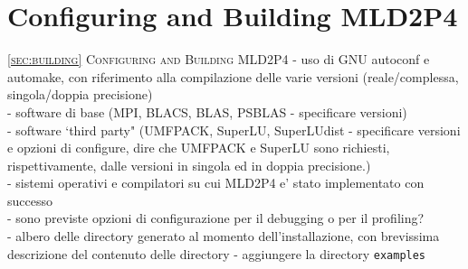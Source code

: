\section{Configuring and Building MLD2P4\label{sec:building}}
         {\textsc{\ref{sec:building} Configuring and Building MLD2P4}}
    - uso di GNU autoconf e automake, con riferimento alla compilazione delle varie versioni
      (reale/complessa, singola/doppia precisione) \\
    - software di base (MPI, BLACS, BLAS, PSBLAS - specificare versioni)\\
    - software `third party" (UMFPACK, SuperLU, SuperLUdist - specificare versioni e opzioni di 
    configure, dire che UMFPACK e SuperLU sono richiesti, rispettivamente, dalle versioni in 
    singola ed in doppia precisione.)\\
    - sistemi operativi e compilatori su cui MLD2P4 e' stato implementato con successo \\
    - sono previste opzioni di configurazione per il debugging o per il profiling? \\
    - albero delle directory generato al momento dell'installazione, con brevissima
    descrizione del contenuto delle directory - aggiungere la directory \texttt{examples}\\
